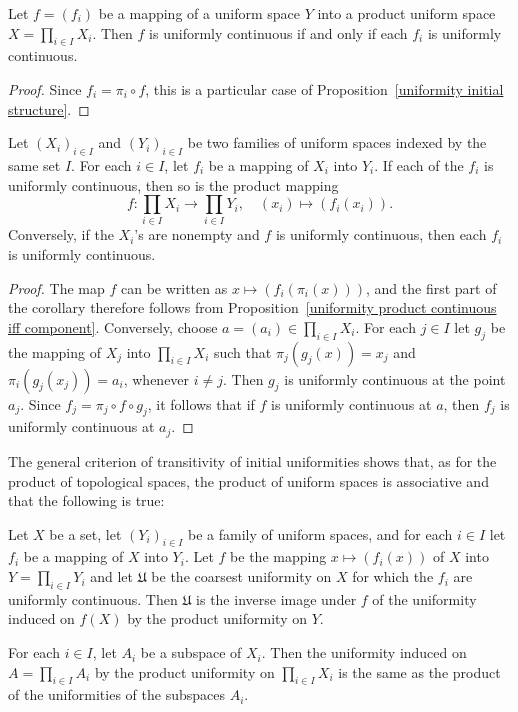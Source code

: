 \begin{proposition}\label{uniformity product continuous iff component}
Let $f=(f_i)$ be a mapping of a uniform space $Y$ into a product uniform space $X=\prod_{i\in I}X_i$. Then $f$ is uniformly continuous if and only if each $f_i$ is uniformly continuous.
\end{proposition}
\begin{proof}
Since $f_i=\pi_i\circ f$, this is a particular case of Proposition~\ref{uniformity initial structure}.
\end{proof}
\begin{corollary}\label{uniform space product map uniformly continuous iff}
Let $(X_i)_{i\in I}$ and $(Y_i)_{i\in I}$ be two families of uniform spaces indexed by the same set $I$. For each $i\in I$, let $f_i$ be a mapping of $X_i$ into $Y_i$. If each of the $f_i$ is uniformly continuous, then so is the product mapping
\[f:\prod_{i\in I}X_i\to\prod_{i\in I}Y_i,\quad (x_i)\mapsto(f_i(x_i)).\]
Conversely, if the $X_i$'s are nonempty and $f$ is uniformly continuous, then each $f_i$ is uniformly continuous.
\end{corollary}
\begin{proof}
The map $f$ can be written as $x\mapsto(f_i(\pi_i(x)))$, and the first part of the corollary therefore follows from Proposition~\ref{uniformity product continuous iff component}. Conversely, choose $a=(a_i)\in\prod_{i\in I}X_i$. For each $j\in I$ let $g_j$ be the mapping of $X_j$ into $\prod_{i\in I}X_i$ such that $\pi_j(g_j(x))=x_j$ and $\pi_i(g_j(x_j))=a_i$, whenever $i\neq j$. Then $g_j$ is uniformly continuous at the point $a_j$. Since $f_j=\pi_j\circ f\circ g_j$, it follows that if $f$ is uniformly continuous at $a$, then $f_j$ is uniformly continuous at $a_j$.
\end{proof}
The general criterion of transitivity of initial uniformities shows that, as for the product of topological spaces, the product of uniform spaces is associative and that the following is true:
\begin{proposition}
Let $X$ be a set, let $(Y_i)_{i\in I}$ be a family of uniform spaces, and for each $i\in I$ let $f_i$ be a mapping of $X$ into $Y_i$. Let $f$ be the mapping $x\mapsto(f_i(x))$ of $X$ into $Y=\prod_{i\in I}Y_i$ and let $\mathfrak{U}$ be the coarsest uniformity on $X$ for which the $f_i$ are uniformly continuous. Then $\mathfrak{U}$ is the inverse image under $f$ of the uniformity induced on $f(X)$ by the product uniformity on $Y$.
\end{proposition}
\begin{corollary}
For each $i\in I$, let $A_i$ be a subspace of $X_i$. Then the uniformity induced on $A=\prod_{i\in I}A_i$ by the product uniformity on $\prod_{i\in I}X_i$ is the same as the product of the uniformities of the subspaces $A_i$.
\end{corollary}
